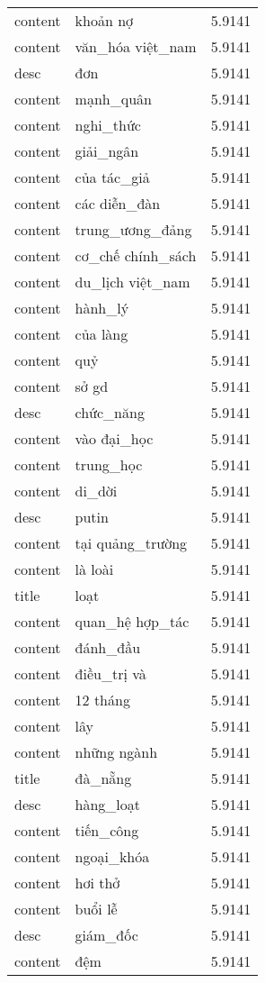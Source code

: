 \documentclass{article}
\begin{document}
\begin{tabular}{lll}
content & khoản nợ & 5.9141\\
content & văn\_hóa việt\_nam & 5.9141\\
desc & đơn & 5.9141\\
content & mạnh\_quân & 5.9141\\
content & nghi\_thức & 5.9141\\
content & giải\_ngân & 5.9141\\
content & của tác\_giả & 5.9141\\
content & các diễn\_đàn & 5.9141\\
content & trung\_ương\_đảng & 5.9141\\
content & cơ\_chế chính\_sách & 5.9141\\
content & du\_lịch việt\_nam & 5.9141\\
content & hành\_lý & 5.9141\\
content & của làng & 5.9141\\
content & quỷ & 5.9141\\
content & sở gd & 5.9141\\
desc & chức\_năng & 5.9141\\
content & vào đại\_học & 5.9141\\
content & trung\_học & 5.9141\\
content & di\_dời & 5.9141\\
desc & putin & 5.9141\\
content & tại quảng\_trường & 5.9141\\
content & là loài & 5.9141\\
title & loạt & 5.9141\\
content & quan\_hệ hợp\_tác & 5.9141\\
content & đánh\_đầu & 5.9141\\
content & điều\_trị và & 5.9141\\
content & 12 tháng & 5.9141\\
content & lây & 5.9141\\
content & những ngành & 5.9141\\
title & đà\_nẵng & 5.9141\\
desc & hàng\_loạt & 5.9141\\
content & tiến\_công & 5.9141\\
content & ngoại\_khóa & 5.9141\\
content & hơi thở & 5.9141\\
content & buổi lễ & 5.9141\\
desc & giám\_đốc & 5.9141\\
content & đệm & 5.9141\\

\end{tabular}
\end{document}
